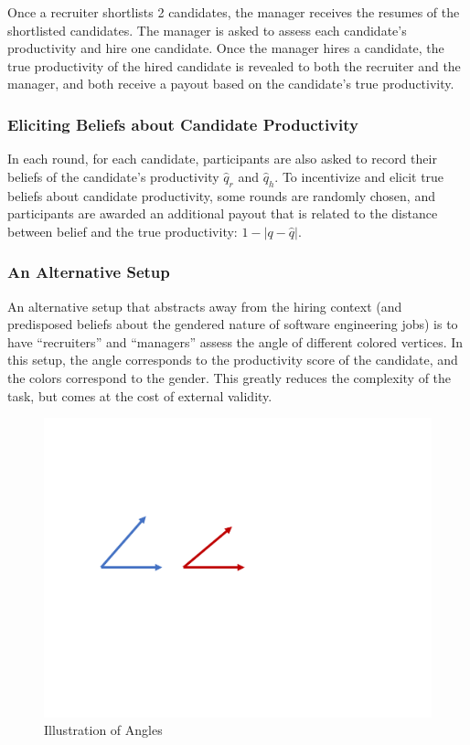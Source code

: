 \documentclass[11pt]{article}
\begin{document}
Once a recruiter shortlists 2 candidates, the manager receives the resumes of the shortlisted candidates. The manager is asked to assess each candidate's productivity and hire one candidate. Once the manager hires a candidate, the true productivity of the hired candidate is revealed to both the recruiter and the manager, and both receive a payout based on the candidate's true productivity.

\subsubsection*{Eliciting Beliefs about Candidate Productivity}

In each round, for each candidate, participants are also asked to record their beliefs of the candidate's productivity $\hat{q}_r$ and $\hat{q}_h$. To incentivize and elicit true beliefs about candidate productivity, some rounds are randomly chosen, and participants are awarded an additional payout that is related to the distance between belief and the true productivity: $1-|q - \hat{q}|$.

\subsubsection*{An Alternative Setup}

An alternative setup that abstracts away from the hiring context (and predisposed beliefs about the gendered nature of software engineering jobs) is to have ``recruiters'' and ``managers'' assess the angle of different colored vertices. In this setup, the angle corresponds to the productivity score of the candidate, and the colors correspond to the gender. This greatly reduces the complexity of the task, but comes at the cost of external validity.

\begin{figure}[H] %
    \centering
    \includegraphics[width=\textwidth, keepaspectratio]{illus/angles.pdf}
    \caption{Illustration of Angles}
    \label{sample_angles}
\end{figure}
\end{document}
